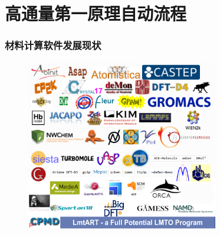\small
%
\section{高通量第一原理自动流程}
\frame
{
	\frametitle{材料计算软件发展现状}
\begin{figure}[h!]
\vspace*{-0.16in}
\centering
\includegraphics[width=3.30in]{Figures/Softwares_logo.png}
\label{Softwares}
\end{figure}
}

